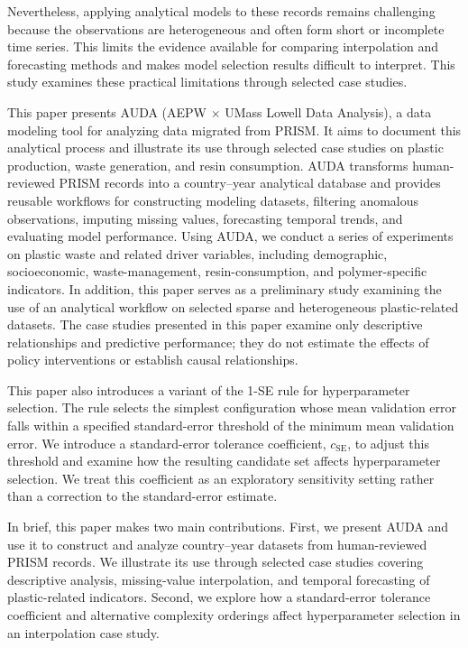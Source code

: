 Nevertheless, applying analytical models to these records remains challenging because the observations are heterogeneous and often form short or incomplete time series.
This limits the evidence available for comparing interpolation and forecasting methods and makes model selection results difficult to interpret.
This study examines these practical limitations through selected case studies.

This paper presents AUDA (AEPW \(\times\) UMass Lowell Data Analysis), a data modeling tool for analyzing data migrated from PRISM.
It aims to document this analytical process and illustrate its use through selected case studies on plastic production, waste generation, and resin consumption.
AUDA transforms human-reviewed PRISM records into a country--year analytical database and provides reusable workflows for constructing modeling datasets, filtering anomalous observations, imputing missing values, forecasting temporal trends, and evaluating model performance.
Using AUDA, we conduct a series of experiments on plastic waste and related driver variables, including demographic, socioeconomic, waste-management, resin-consumption, and polymer-specific indicators.
In addition, this paper serves as a preliminary study examining the use of an analytical workflow on selected sparse and heterogeneous plastic-related datasets.
The case studies presented in this paper examine only descriptive relationships and predictive performance; they do not estimate the effects of policy interventions or establish causal relationships.

This paper also introduces a variant of the 1-SE rule for hyperparameter selection.
The rule selects the simplest configuration whose mean validation error falls within a specified standard-error threshold of the minimum mean validation error.
We introduce a standard-error tolerance coefficient, \(c_{\mathrm{SE}}\), to adjust this threshold and examine how the resulting candidate set affects hyperparameter selection.
We treat this coefficient as an exploratory sensitivity setting rather than a correction to the standard-error estimate.

In brief, this paper makes two main contributions.
First, we present AUDA and use it to construct and analyze country--year datasets from human-reviewed PRISM records.
We illustrate its use through selected case studies covering descriptive analysis, missing-value interpolation, and temporal forecasting of plastic-related indicators.
Second, we explore how a standard-error tolerance coefficient and alternative complexity orderings affect hyperparameter selection in an interpolation case study.
